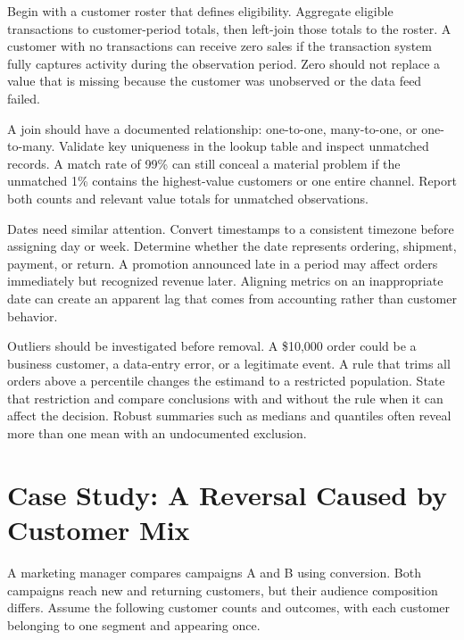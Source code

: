 \noindent Begin with a customer roster that defines eligibility. Aggregate
eligible transactions to customer-period totals, then left-join those
totals to the roster. A customer with no transactions can receive zero
sales if the transaction system fully captures activity during the
observation period. Zero should not replace a value that is missing
because the customer was unobserved or the data feed failed.

A join should have a documented relationship: one-to-one, many-to-one,
or one-to-many. Validate key uniqueness in the lookup table and inspect
unmatched records. A match rate of 99\% can still conceal a material
problem if the unmatched 1\% contains the highest-value customers or one
entire channel. Report both counts and relevant value totals for
unmatched observations.

Dates need similar attention. Convert timestamps to a consistent
timezone before assigning day or week. Determine whether the date
represents ordering, shipment, payment, or return. A promotion announced
late in a period may affect orders immediately but recognized revenue
later. Aligning metrics on an inappropriate date can create an apparent
lag that comes from accounting rather than customer behavior.

Outliers should be investigated before removal. A \$10,000 order could
be a business customer, a data-entry error, or a legitimate event. A
rule that trims all orders above a percentile changes the estimand to a
restricted population. State that restriction and compare conclusions
with and without the rule when it can affect the decision. Robust
summaries such as medians and quantiles often reveal more than one mean
with an undocumented exclusion.

\hypertarget{M02-case-study-a-reversal-caused-by-customer-mix}{%
\section{Case Study: A Reversal Caused by Customer
Mix}\label{M02-case-study-a-reversal-caused-by-customer-mix}}

\noindent A marketing manager compares campaigns A and B using conversion. Both
campaigns reach new and returning customers, but their audience
composition differs. Assume the following customer counts and outcomes,
with each customer belonging to one segment and appearing once.

